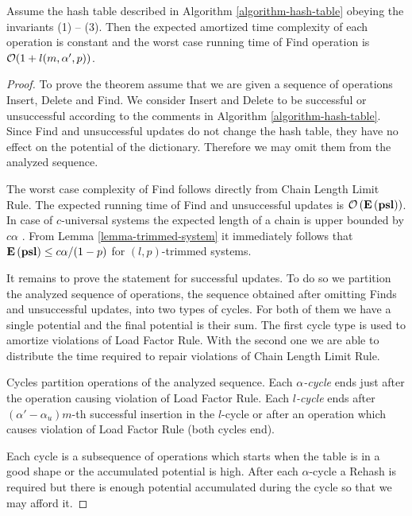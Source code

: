 \begin{theorem}
\label{theorem-amortised-expected-time}
Assume the hash table described in Algorithm \ref{algorithm-hash-table} obeying the invariants (1) -- (3). 
Then the expected amortized time complexity of each operation is constant and the worst case running time of Find operation is $\mathcal{O}(1 + l(m, \alpha', p))$.
\end{theorem}
\begin{proof}
To prove the theorem assume that we are given a sequence of operations Insert, Delete and Find. 
We consider Insert and Delete to be successful or unsuccessful according to the comments in Algorithm \ref{algorithm-hash-table}. 
Since Find and unsuccessful updates do not change the hash table, they have no effect on the potential of the dictionary.
Therefore we may omit them from the analyzed sequence. 

The worst case complexity of Find follows directly from Chain Length Limit Rule.
The expected running time of Find and unsuccessful updates is $\mathcal{O}\left(\mathbf{E}\left(\mathbf{psl}\right)\right)$.
In case of $c$-universal systems the expected length of a chain is upper bounded by $c\alpha$ \cite{DBLP:conf/focs/WegmanC79}.
From Lemma \ref{lemma-trimmed-system} it immediately follows that $\mathbf{E}\left(\mathbf{psl}\right) \leq c\alpha/(1-p)$ for $(l, p)$-trimmed systems.

It remains to prove the statement for successful updates. 
To do so we partition the analyzed sequence of operations, the sequence obtained after omitting Finds and unsuccessful updates, into two types of cycles. 
For both of them we have a single potential and the final potential is their sum.
The first cycle type is used to amortize violations of Load Factor Rule. 
With the second one we are able to distribute the time required to repair violations of Chain Length Limit Rule.

\begin{definition}
Cycles partition operations of the analyzed sequence.
Each \emph{$\alpha$-cycle} ends just after the operation causing violation of Load Factor Rule.
Each \emph{$l$-cycle} ends after $(\alpha'-\alpha_u)m$-th successful insertion in the $l$-cycle or after an operation which causes violation of Load Factor Rule (both cycles end).
\end{definition}

Each cycle is a subsequence of operations which starts when the table is in a good shape or the accumulated potential is high. 
After each $\alpha$-cycle a Rehash is required but there is enough potential accumulated during the cycle so that we may afford it.


\end{proof}
